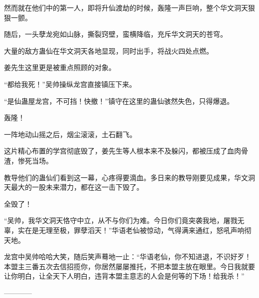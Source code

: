 \begin{this_body}
然而就在他们中的第一人，即将升仙渡劫的时候，轰隆一声巨响，整个华文洞天狠狠一颤。

随后，一头孽龙宛如山脉，撕裂窍壁，蛮横降临，充斥华文洞天的苍穹。

大量的敌方蛊仙在华文洞天各地显现，同时出手，将战火四处点燃。

姜先生这里更是被重点照顾的对象。

“都给我死！”吴帅操纵龙宫直接镇压下来。

“是仙蛊屋龙宫，不可挡！快撤！”镇守在这里的蛊仙骇然失色，只得爆退。

轰隆！

一阵地动山摇之后，烟尘滚滚，土石翻飞。

这片精心布置的学宫彻底毁了，姜先生等人根本来不及躲闪，都被压成了血肉骨渣，惨死当场。

教导他们的蛊仙们看到这一幕，心疼得要滴血。多日来的教导刚要见成果，华文洞天最大的一股未来潜力，都在这一击下毁了。

全毁了！

“吴帅，我华文洞天恪守中立，从不与你们为难。今日你们竟突袭我地，屠戮无辜，实在是无理至极，罪孽滔天！”华语老仙被惊动，气得满来通红，怒吼声响彻天地。

龙宫中吴帅哈哈大笑，随后笑声蓦地一止：“华语老仙，你不知进退，不识好歹！本盟主三番五次去信招揽你，你居然屡屡推托，不把本盟主放在眼里。今日我就要让你明白，让全天下人明白，违背本盟主意志的人会是何等的下场！给我杀！”

------------

\end{this_body}


